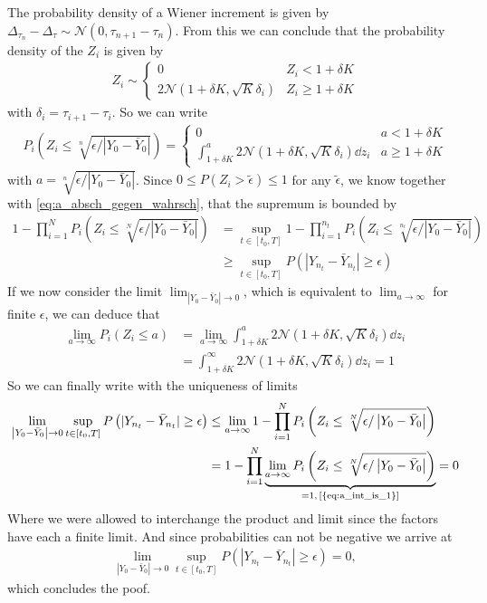 The probability density of a Wiener increment is given by $\Delta_{\tau_n} - \Delta_\tau \sim  \mathcal{N}(0,\tau_{n+1}-\tau_n)$. From this we can conclude that the probability density of the $Z_i$ is given by 
\begin{align}
Z_i \sim \begin{cases} 
      0 & Z_i< 1+\delta K \\
      2 \mathcal{N}(1+\delta K,\sqrt{K} \delta_i) &  Z_i\geq 1+\delta K
   \end{cases}
\end{align}
with $\delta_i = \tau_{i+1}-\tau_i$. So we can write
\begin{align}
P_i\left(Z_i\leq \sqrt[n]{ \epsilon/\left|Y_0-\bar{Y}_0\right|}\right) =
 \begin{cases} 
      0 & a< 1+\delta K \\
      \int_{1+\delta K}^{a} 2 \mathcal{N}(1+\delta K,\sqrt{K} \delta_i) \dd z_i & a\geq 1+\delta K
   \end{cases}
\end{align}
with $a=\sqrt[n]{\epsilon/\left|Y_0-\bar{Y}_0\right| }$.
Since $0\leq P(Z_i>\tilde{\epsilon})\leq 1$ for any $\tilde{\epsilon}$, we know together with \cref{eq:a_absch_gegen_wahrsch}, that the supremum is bounded by
\begin{align}
1 - \prod_{i=1}^N P_i\left(Z_i\leq \sqrt[N]{ \epsilon/\left|Y_0-\bar{Y}_0\right|}\right) &= \sup_{t\in[t_0,T]}  1 - \prod_{i=1}^{n_t} P_i\left(Z_i\leq \sqrt[n_t]{ \epsilon/\left|Y_0-\bar{Y}_0\right|}\right) \\ &\geq\sup_{t\in[t_0,T]} P\left(|Y_{n_t}-\bar{Y}_{n_t}|\geq \epsilon\right)
\end{align}
If we now consider the limit $\lim_{\left|Y_0-\bar{Y}_0\right| \rightarrow 0}$, which is equivalent to $\lim_{a\rightarrow \infty}$ for finite $\epsilon$, we can deduce that
\begin{align}
\lim_{a\rightarrow \infty} P_i(Z_i\leq a) &= \lim_{a\rightarrow \infty} \int_{1+\delta K}^{a} 2\mathcal{N}(1+\delta K,\sqrt{K}\delta_i)\dd z_i \\
&= \int_{1+\delta K}^{\infty} 2\mathcal{N}(1+\delta K,\sqrt{K}\delta_i)\dd z_i =1\label{eq:a_int_is_1}
\end{align}
So we can finally write with the uniqueness of limits
\begin{align}
\lim_{\left|Y_0-\bar{Y}_0\right| \rightarrow 0} \sup_{t\in[t_0,T]} P\left(|Y_{n_t}-\bar{Y}_{n_t}|\geq \epsilon\right) &\leq \lim_{a\rightarrow \infty} 1 -  \prod_{i=1}^N P_i\left(Z_i\leq \sqrt[N]{ \epsilon/\left|Y_0-\bar{Y}_0\right|}\right)\\
&=1 -  \prod_{i=1}^N \underbrace{\lim_{a\rightarrow \infty} P_i\left(Z_i\leq \sqrt[N]{ \epsilon/\left|Y_0-\bar{Y}_0\right|}\right)}_{=1,\,\text{\cref{{eq:a_int_is_1}}}} = 0
\end{align}
Where we were allowed to interchange the product and limit since the factors have each a finite limit.
And since probabilities can not be negative we arrive at
\begin{align}
\lim_{\left|Y_0-\bar{Y}_0\right| \rightarrow 0} \sup_{t\in[t_0,T]} P\left(|Y_{n_t}-\bar{Y}_{n_t}|\geq \epsilon\right) = 0,
\end{align}
which concludes the poof.